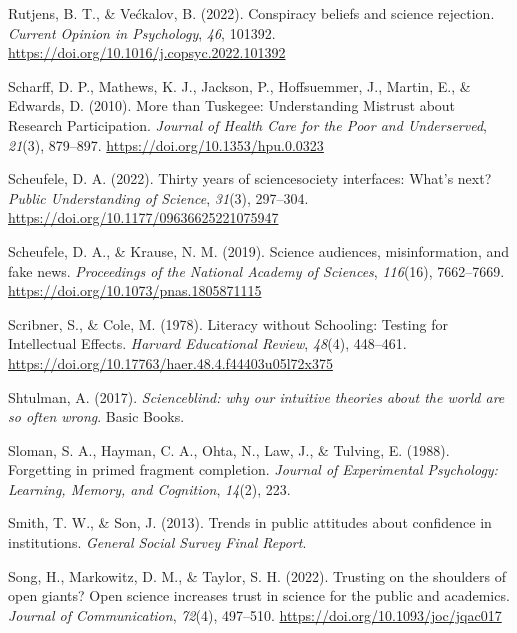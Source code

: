 \documentclass[
  man,
  floatsintext,
  longtable,
  nolmodern,
  notxfonts,
  notimes,
  colorlinks=true,linkcolor=blue,citecolor=blue,urlcolor=blue]{apa7}
\newlength{\cslhangindent}
\newenvironment{CSLReferences}[2] %
 {\begin{list}{}{%
  \setlength{\itemindent}{0pt}
  \setlength{\leftmargin}{0pt}
  \setlength{\parsep}{0pt}
  \ifodd #1
   \setlength{\leftmargin}{\cslhangindent}
   \setlength{\itemindent}{-1\cslhangindent}
  \fi
  \setlength{\itemsep}{#2\baselineskip}}}
 {\end{list}}
\begin{document}
\begin{CSLReferences}{1}{0}
Rutjens, B. T., \& Većkalov, B. (2022). Conspiracy beliefs and science
rejection. \emph{Current Opinion in Psychology}, \emph{46}, 101392.
\url{https://doi.org/10.1016/j.copsyc.2022.101392}

Scharff, D. P., Mathews, K. J., Jackson, P., Hoffsuemmer, J., Martin,
E., \& Edwards, D. (2010). More than Tuskegee: Understanding Mistrust
about Research Participation. \emph{Journal of Health Care for the Poor
and Underserved}, \emph{21}(3), 879--897.
\url{https://doi.org/10.1353/hpu.0.0323}

Scheufele, D. A. (2022). Thirty years of science{\textendash}society
interfaces: What{'}s next? \emph{Public Understanding of Science},
\emph{31}(3), 297--304. \url{https://doi.org/10.1177/09636625221075947}

Scheufele, D. A., \& Krause, N. M. (2019). Science audiences,
misinformation, and fake news. \emph{Proceedings of the National Academy
of Sciences}, \emph{116}(16), 7662--7669.
\url{https://doi.org/10.1073/pnas.1805871115}

Scribner, S., \& Cole, M. (1978). Literacy without Schooling: Testing
for Intellectual Effects. \emph{Harvard Educational Review},
\emph{48}(4), 448--461.
\url{https://doi.org/10.17763/haer.48.4.f44403u05l72x375}

Shtulman, A. (2017). \emph{Scienceblind: why our intuitive theories
about the world are so often wrong}. Basic Books.

Sloman, S. A., Hayman, C. A., Ohta, N., Law, J., \& Tulving, E. (1988).
Forgetting in primed fragment completion. \emph{Journal of Experimental
Psychology: Learning, Memory, and Cognition}, \emph{14}(2), 223.

Smith, T. W., \& Son, J. (2013). Trends in public attitudes about
confidence in institutions. \emph{General Social Survey Final Report}.

Song, H., Markowitz, D. M., \& Taylor, S. H. (2022). Trusting on the
shoulders of open giants? Open science increases trust in science for
the public and academics. \emph{Journal of Communication}, \emph{72}(4),
497--510. \url{https://doi.org/10.1093/joc/jqac017}


\end{CSLReferences}
\end{document}
